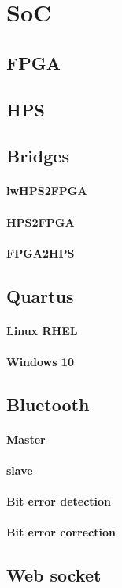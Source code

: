 	\section{SoC}
		\subsection{FPGA}
		\subsection{HPS}
		\subsection{Bridges}
			\paragraph{lwHPS2FPGA}
			\paragraph{HPS2FPGA}
			\paragraph{FPGA2HPS}
		\subsection{Quartus}
			\paragraph{Linux RHEL}
			\paragraph{Windows 10}
		\subsection{Bluetooth}
			\paragraph{Master}
			\paragraph{slave}
			\paragraph{Bit error detection}
			\paragraph{Bit error correction}
		\subsection{Web socket}




%  